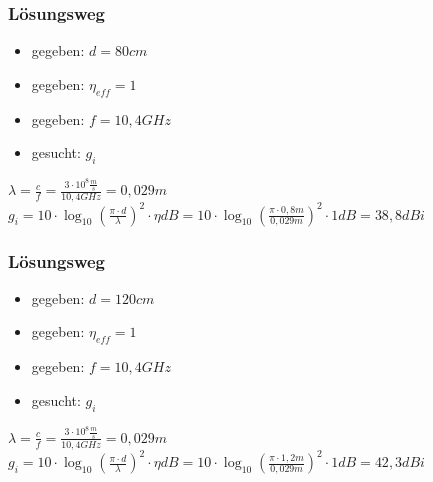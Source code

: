 \begin{frame}
\frametitle{Lösungsweg}
\begin{itemize}
  \item gegeben: $d = 80cm$
  \item gegeben: $\eta_{eff} = 1$
  \item gegeben: $f = 10,4GHz$
  \item gesucht: $g_i$
  \end{itemize}
    \pause
    $\lambda = \frac{c}{f} = \frac{3\cdot 10^8\frac{m}{s}}{10,4GHz} = 0,029m$
    \pause
    $g_i = 10 \cdot \log_{10}{(\frac{\pi \cdot d}{\lambda})^2} \cdot \eta dB = 10 \cdot \log_{10}{(\frac{\pi \cdot 0,8m}{0,029m})^2} \cdot 1dB = 38,8dBi$



\end{frame}

\begin{frame}
\end{frame}

\begin{frame}
\frametitle{Lösungsweg}
\begin{itemize}
  \item gegeben: $d = 120cm$
  \item gegeben: $\eta_{eff} = 1$
  \item gegeben: $f = 10,4GHz$
  \item gesucht: $g_i$
  \end{itemize}
    \pause
    $\lambda = \frac{c}{f} = \frac{3\cdot 10^8\frac{m}{s}}{10,4GHz} = 0,029m$
    \pause
    $g_i = 10 \cdot \log_{10}{(\frac{\pi \cdot d}{\lambda})^2} \cdot \eta dB = 10 \cdot \log_{10}{(\frac{\pi \cdot 1,2m}{0,029m})^2} \cdot 1dB = 42,3dBi$



\end{frame}%
